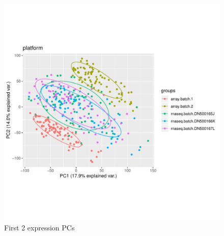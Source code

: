 \subsection{}

\begin{figure}
    \includegraphics[width=1.0\textwidth,page=1]{mainmatter/figures/chapter_02/compare_phenotype_by_platform.plots.pdf}
    \caption{First 2 expression PCs}
    \label{fig:expression_pcs}
\end{figure}

